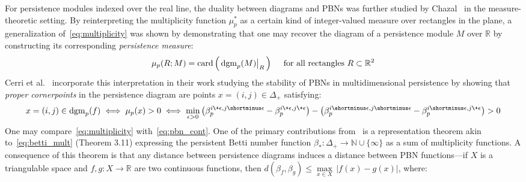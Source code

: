 For persistence modules indexed over the real line, the duality between diagrams and PBNs was further studied by Chazal~\cite{chazal2016structure} in the measure-theoretic setting. 
By reinterpreting the multiplicity function $\mu^\ast_p$ as a certain kind of integer-valued measure over rectangles in the plane, a generalization of~\eqref{eq:multiplicity} 
was shown by demonstrating that one may recover the diagram of a persistence module $M$ over $\mathbb{R}$ by constructing its corresponding \emph{persistence measure}:
\begin{equation}\label{eq:measure}
	\mu_p(R; M) = \mathrm{card}\left( \,
	\restr{\mathrm{dgm}_p(M)}{R} \,
	\right) \quad \text{ for all rectangles } R \subset \mathbb{R}^2 
\end{equation}
Cerri et al.~\cite{cerri2013betti} incorporate this interpretation in their work studying the stability of PBNs in multidimensional persistence by showing that \emph{proper cornerpoints} in the persistence diagram are points $x = (i,j) \in \Delta_+$ satisfying:
\begin{equation}\label{eq:pbn_cont}
	x = (i,j) \in \mathrm{dgm}_p(f) \; \Longleftrightarrow \; \mu_p(x) > 0 \; \Longleftrightarrow \; \min_{\epsilon > 0} \left(\beta_p^{i \+ \epsilon, j \shortminus \epsilon} - \beta_p^{i \+ \epsilon, j \+ \epsilon} \right) - \left(\beta_p^{i \shortminus \epsilon, j \shortminus \epsilon} - \beta_p^{i \shortminus \epsilon, j \+ \epsilon} \right) > 0
\end{equation}
One may compare~\eqref{eq:multiplicity} with~\eqref{eq:pbn_cont}. One of the primary contributions from~\cite{cerri2013betti} is a representation theorem akin to~\eqref{eq:betti_mult} (Theorem 3.11) expressing the persistent Betti number function $\beta_\ast : \Delta_+ \to \mathbb{N}\cup \{\infty\}$ as a sum of multiplicity functions. 
A consequence of this theorem is that any distance between persistence diagrams induces a distance between PBN functions---if $X$ is a triangulable space and $f,g : X \to \mathbb{R}$ are two continuous functions, then $d(\beta_f, \beta_g) \leq \max\limits_{x \in X} \, \lvert f(x) - g(x) \rvert$, where:
